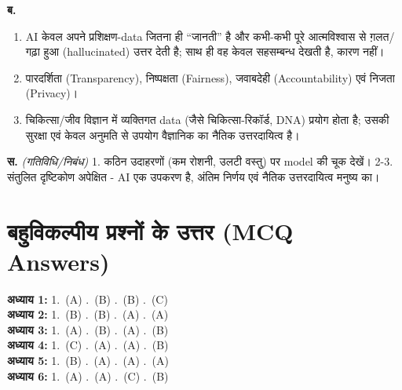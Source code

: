 \noindent\textbf{ब.}
\begin{enumerate}[leftmargin=1.6em]
  \item AI केवल अपने प्रशिक्षण-data जितना ही “जानती” है और कभी-कभी पूरे आत्मविश्वास
        से ग़लत/गढ़ा हुआ (hallucinated) उत्तर देती है; साथ ही वह केवल सहसम्बन्ध देखती
        है, कारण नहीं।
  \item पारदर्शिता (Transparency), निष्पक्षता (Fairness), जवाबदेही (Accountability)
        एवं निजता (Privacy)।
  \item चिकित्सा/जीव विज्ञान में व्यक्तिगत data (जैसे चिकित्सा-रिकॉर्ड, DNA) प्रयोग
        होता है; उसकी सुरक्षा एवं केवल अनुमति से उपयोग वैज्ञानिक का नैतिक उत्तरदायित्व है।
\end{enumerate}

\noindent\textbf{स.} \textit{(गतिविधि/निबंध)} 1. कठिन उदाहरणों (कम रोशनी, उलटी वस्तु)
पर model की चूक देखें। 2-3. संतुलित दृष्टिकोण अपेक्षित - AI एक उपकरण है, अंतिम निर्णय
एवं नैतिक उत्तरदायित्व मनुष्य का।

\section*{बहुविकल्पीय प्रश्नों के उत्तर (MCQ Answers)}
\noindent
\textbf{अध्याय 1:} 1.~(A) .~(B) .~(B) .~(C)\\
\textbf{अध्याय 2:} 1.~(B) .~(B) .~(A) .~(A)\\
\textbf{अध्याय 3:} 1.~(A) .~(B) .~(A) .~(B)\\
\textbf{अध्याय 4:} 1.~(C) .~(A) .~(A) .~(B)\\
\textbf{अध्याय 5:} 1.~(B) .~(A) .~(A) .~(A)\\
\textbf{अध्याय 6:} 1.~(A) .~(A) .~(C) .~(B)
